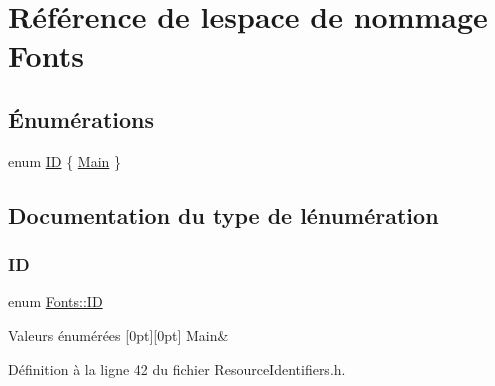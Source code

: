 \hypertarget{namespace_fonts}{}\section{Référence de l\textquotesingle{}espace de nommage Fonts}
\label{namespace_fonts}
\subsection*{Énumérations}
\begin{DoxyCompactItemize}
\item 
enum \hyperlink{namespace_fonts_a240717ec0dc75e98501af734a02c396d}{ID} \{ \hyperlink{namespace_fonts_a240717ec0dc75e98501af734a02c396da52f845eea0c76cc47d8748f6c47c1217}{Main}
 \}
\end{DoxyCompactItemize}


\subsection{Documentation du type de l\textquotesingle{}énumération}
\hypertarget{namespace_fonts_a240717ec0dc75e98501af734a02c396d}{}\label{namespace_fonts_a240717ec0dc75e98501af734a02c396d} 
\subsubsection{\texorpdfstring{ID}{ID}}
{\footnotesize\ttfamily enum \hyperlink{namespace_fonts_a240717ec0dc75e98501af734a02c396d}{Fonts\+::\+ID}}

\begin{DoxyEnumFields}{Valeurs énumérées}
[0pt][0pt]{}\hypertarget{namespace_fonts_a240717ec0dc75e98501af734a02c396da52f845eea0c76cc47d8748f6c47c1217}{}\label{namespace_fonts_a240717ec0dc75e98501af734a02c396da52f845eea0c76cc47d8748f6c47c1217} 
Main&\\
\hline

\end{DoxyEnumFields}


Définition à la ligne 42 du fichier Resource\+Identifiers.\+h.

